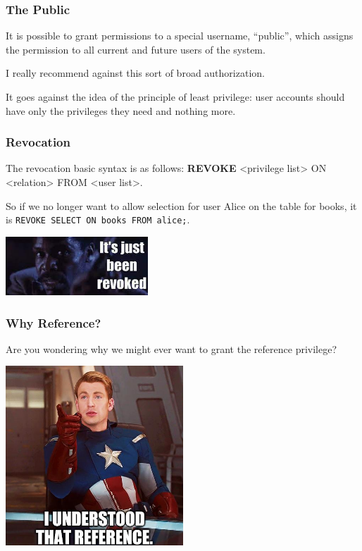 \begin{frame}
\frametitle{The Public}

It is possible to grant permissions to a special username, ``public'', which assigns the permission to all current and future users of the system. 

I really recommend against this sort of broad authorization. 

It goes against the idea of the principle of least privilege: user accounts should have only the privileges they need and nothing more.

\end{frame}



\begin{frame}
\frametitle{Revocation}

The revocation basic syntax is as follows: \textbf{REVOKE} <privilege list> ON <relation> FROM <user list>.

So if we no longer want to allow selection for user Alice on the table for books, it is \texttt{REVOKE SELECT ON books FROM alice;}. 

\begin{center}
	\includegraphics[width=0.4\textwidth]{images/revoked.jpg}
\end{center}

\end{frame}



\begin{frame}
\frametitle{Why Reference?}

Are  you wondering why we might ever want to grant the reference privilege?

\begin{center}
	\includegraphics[width=0.5\textwidth]{images/cap-reference.png}
\end{center}

\end{frame}



